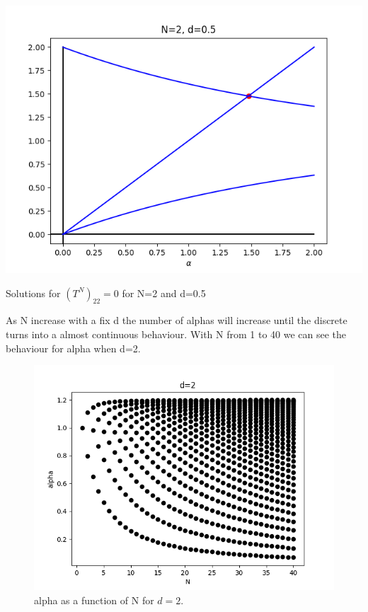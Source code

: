 \begin{marginfigure}
  \includegraphics{images5/N=2,d=0.5.png}
  \centering
  \caption{Solutions for $(T^N)_{22} = 0$ for N=2 and d=0.5}
\end{marginfigure}

As N increase with a fix d the number of alphas will increase until the discrete turns into a almost continuous behaviour. With N from 1 to 40 we can see the behaviour for alpha when d=2.

\begin{figure}
  \includegraphics[H]{images5/N_alpha_d=2.png}
  \centering
  \caption{alpha as a function of N for $d = 2$.}
\end{figure}

